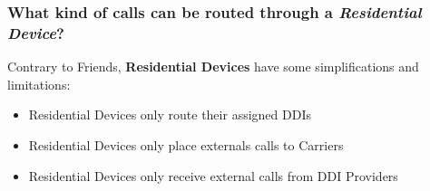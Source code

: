 \documentclass[letterpaper,10pt,spanish]{sphinxmanual}
\begin{document}
\subsubsection{What kind of calls can be routed through a \emph{Residential Device}?}
\label{administration_portal/client/residential/residential_devices:what-kind-of-calls-can-be-routed-through-a-residential-device}
Contrary to Friends, \textbf{Residential Devices} have some simplifications and limitations:
\begin{itemize}
\item {} 
Residential Devices only route their assigned DDIs

\item {} 
Residential Devices only place externals calls to Carriers

\item {} 
Residential Devices only receive external calls from DDI Providers

\end{itemize}
\end{document}
